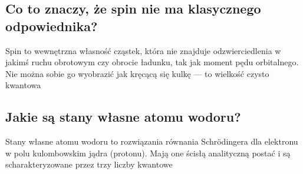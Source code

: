 \subsection{Co to znaczy, że spin nie ma klasycznego odpowiednika?}

Spin to wewnętrzna własność cząstek, która nie znajduje odzwierciedlenia w jakimś ruchu obrotowym czy obrocie ładunku, tak jak moment pędu orbitalnego. Nie można sobie go wyobrazić jak kręcącą się kulkę — to wielkość czysto kwantowa

\subsection{Jakie są stany własne atomu wodoru?}

Stany własne atomu wodoru to rozwiązania równania Schrödingera dla elektronu w polu kulombowskim jądra (protonu). Mają one ścisłą analityczną postać i są scharakteryzowane przez trzy liczby kwantowe

